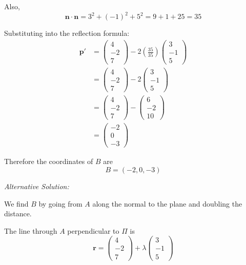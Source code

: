 \documentclass[leqno]{article}
\begin{document}
\begin{enumerate}[
  label=\textbf{\arabic*.},
  leftmargin=*,
  topsep=0pt,
  partopsep=0pt,
  parsep=0pt
]
\begin{djsSolution}
Also,
\[
\mathbf n\cdot\mathbf n=3^2+(-1)^2+5^2=9+1+25=35
\]

Substituting into the reflection formula:
\begin{align*}
\mathbf p'
&=\begin{pmatrix}4\\-2\\7\end{pmatrix}-2\left(\frac{35}{35}\right)\begin{pmatrix}3\\-1\\5\end{pmatrix}\\
&=\begin{pmatrix}4\\-2\\7\end{pmatrix}-2\begin{pmatrix}3\\-1\\5\end{pmatrix}\\
&=\begin{pmatrix}4\\-2\\7\end{pmatrix}-\begin{pmatrix}6\\-2\\10\end{pmatrix}\\
&=\begin{pmatrix}-2\\0\\-3\end{pmatrix}
\end{align*}

Therefore the coordinates of \(B\) are
\[
B=(-2,0,-3)
\]

{\setlength{\parskip}{8pt}%
\textit{Alternative Solution:}

We find \(B\) by going from \(A\) along the normal to the plane and doubling the distance.

The line through \(A\) perpendicular to \(\Pi\) is
\[
\mathbf r=\begin{pmatrix}4\\-2\\7\end{pmatrix}+\lambda\begin{pmatrix}3\\-1\\5\end{pmatrix}
\]

}
\end{djsSolution}
\end{enumerate}
\end{document}
